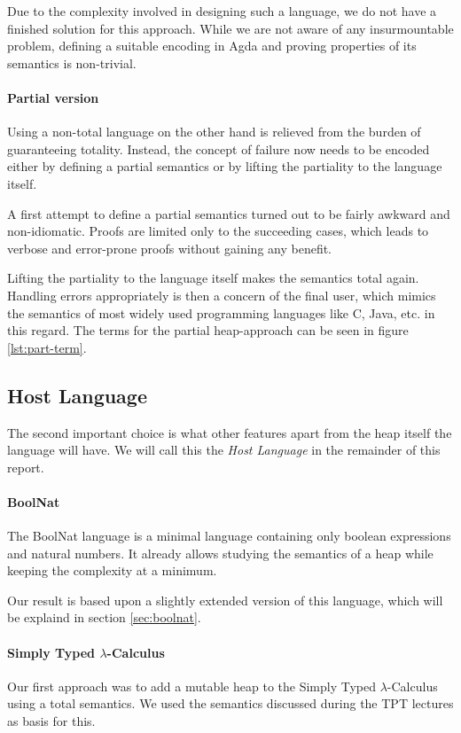 \documentclass[12pt, a4paper, oneside]{article}
\begin{document}
Due to the complexity involved in designing such a language, we do not have a finished solution for this approach.
While we are not aware of any insurmountable problem, defining a suitable encoding in Agda
and proving properties of its semantics is non-trivial.


\paragraph{Partial version}
Using a non-total language on the other hand is relieved from the burden of guaranteeing totality.
Instead, the concept of failure now needs to be encoded either by defining a partial semantics
or by lifting the partiality to the language itself.

A first attempt to define a partial semantics turned out to be fairly awkward and non-idiomatic. Proofs are limited only to the succeeding cases, which leads to verbose and error-prone proofs without gaining any benefit. 

Lifting the partiality to the language itself makes the semantics total again.
Handling errors appropriately is then a concern of the final user, which mimics the semantics of most widely used programming languages like C, Java, etc. in this regard.
The terms for the partial heap-approach can be seen in figure \ref{lst:part-term}.



\subsection{Host Language}
The second important choice is what other features apart from the heap itself the language will have. We will call this the \emph{Host Language} in the remainder of this report.

\paragraph{BoolNat}
The BoolNat language is a minimal language containing only boolean expressions and natural numbers. It already allows studying
the semantics of a heap while keeping the complexity at a minimum.

Our result is based upon a slightly extended version of this language, which will be explaind in section \ref{sec:boolnat}.

\paragraph{Simply Typed $\lambda$-Calculus}
Our first approach was to add a mutable heap to the Simply Typed $\lambda$-Calculus using a total semantics. We used the
semantics discussed during the TPT lectures as basis for this.
\end{document}
